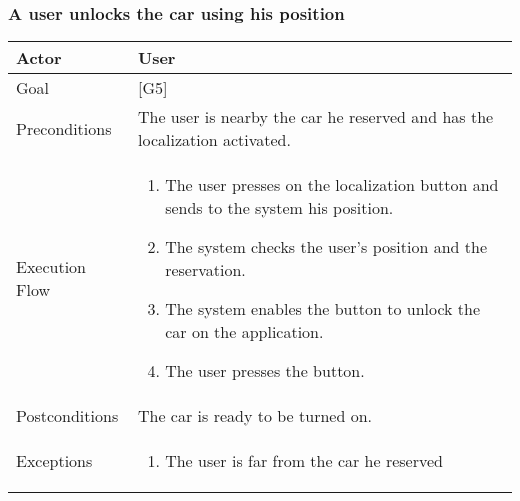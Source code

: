 \documentclass{article}
\begin{document}
	\subsubsection{A user unlocks the car using his position}
	\begin{tabularx}{\textwidth}{  l  X  }
		\hline
		Actor & User\\
		\hline
		Goal & [G5]\\
		\hline
		Preconditions & The user is nearby the car he reserved and has the localization activated.\\
		\hline
		Execution Flow & \begin{enumerate}
			\item{The user presses on the localization button and sends to the system his position.}
										 \item{The system checks the user's position and the reservation.}
										 \item{The system enables the button to unlock the car on the application.}
										 \item{The user presses the button.}
										\end{enumerate}\\
		\hline
		Postconditions & The car is ready to be turned on.\\
		\hline
		Exceptions & \begin{enumerate}
								 \item{The user is far from the car he reserved}
								\end{enumerate}\\
		\hline
	\end{tabularx}
\end{document}
